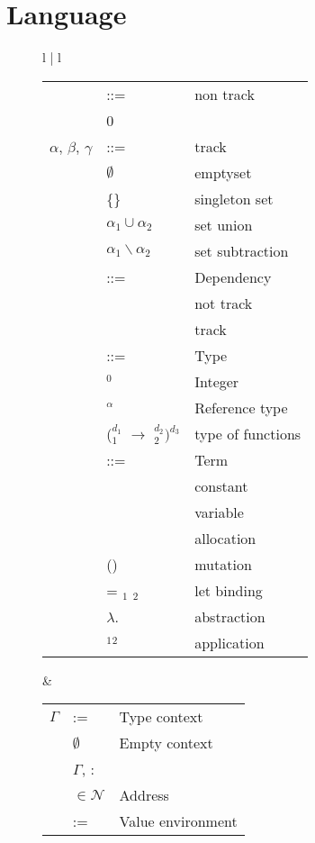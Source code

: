 \section{Language}
\begin{figure}[!htb]
\small
\centering
\begin{tabular}{l | l}
\begin{tabular}{r l l}
\nonterm{non-track} & ::= & non track \\
& 0 & \\
$\alpha$, $\beta$, $\gamma$ & ::= &  track \\
& $\emptyset$ &  emptyset \\
& \{\nonterm{x}\} & singleton set \\
& $\alpha_1 \cup \alpha_2$  & set union \\
& $\alpha_1 \backslash \alpha_2$ & set subtraction\\
\nonterm{d} & ::=  & Dependency \\
& \nonterm{non-track} 	& not track \\
& \nonterm{track} & track \\
\nonterm{T} & ::= & Type \\
& \nonterm{Int}$^{0}$ & Integer \\
& \nonterm{\&Int}$^{\alpha}$ & Reference type \\
& (\nonterm{T}$_1^{d_1}$ $\to$ \nonterm{T}$_2^{d_2})^{d_3}$ & type of functions \\
\nonterm{t} & ::= & Term \\
& \nonterm{c} & constant \\
& \nonterm{x} & variable \\
& \nonterm{alloc} & allocation \\
& \nonterm{inc}(\nonterm{x}) & mutation \\
& \KW{let} \nonterm{x} = \nonterm{t}$_1$ \KW{in} \nonterm{t}$_2$  & let binding \\
& $\lambda$\nonterm{x}.\nonterm{t} & abstraction \\
& \nonterm{t}$_1$\nonterm{t}$_2$ & application \\
\end{tabular} &
\begin{tabular}{r l l}
$\Gamma$ & :=  & Type context \\
& $\emptyset$ & Empty context \\
& $\Gamma$, \nonterm{x}:\nonterm{T} \\
\nonterm{l} & $\in \mathcal{N}$  & Address \\
\nonterm{H} & := & Value environment \\

\end{tabular}
\end{tabular}
\end{figure}
